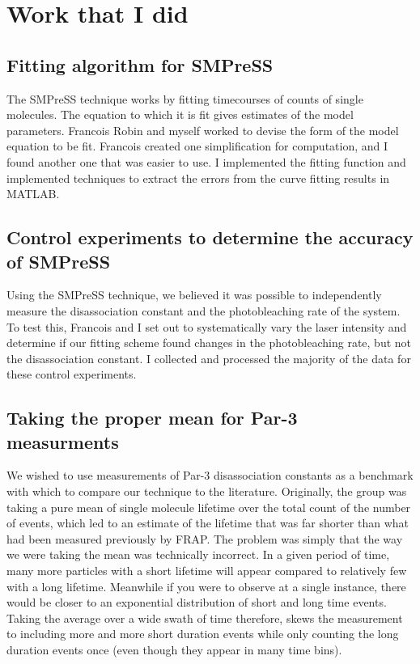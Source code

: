 \section{Work that I did}

\subsection{Fitting algorithm for SMPreSS}

The SMPreSS technique works by fitting timecourses of counts of single molecules.  The equation to which it is fit gives estimates of the model parameters.  Francois Robin and myself worked to devise the form of the model equation to be fit. Francois created one simplification for computation, and I found another one that was easier to use.  I implemented the fitting function and implemented techniques to extract the errors from the curve fitting results in MATLAB.

\subsection{Control experiments to determine the accuracy of SMPreSS}

Using the SMPreSS technique, we believed it was possible to independently measure the disassociation constant and the photobleaching rate of the system.  To test this, Francois and I set out to systematically vary the laser intensity and determine if our fitting scheme found changes in the photobleaching rate, but not the disassociation constant.  I collected and processed the majority of the data for these control experiments.

\subsection{Taking the proper mean for Par-3 measurments}

We wished to use measurements of Par-3 disassociation constants as a benchmark with which to compare our technique to the literature.  Originally, the group was taking a pure mean of single molecule lifetime over the total count of the number of events, which led to an estimate of the lifetime that was far shorter than what had been measured previously by FRAP.  The problem was simply that the way we were taking the mean was technically incorrect.  In a given period of time, many more particles with a short lifetime will appear compared to relatively few with a long lifetime.  Meanwhile if you were to observe at a single instance, there would be closer to an exponential distribution of short and long time events. Taking the average over a wide swath of time therefore, skews the measurement to including more and more short duration events while only counting the long duration events once (even though they appear in many time bins).


